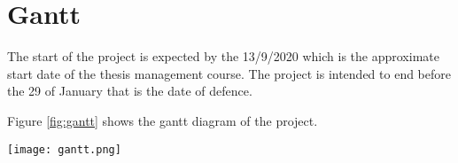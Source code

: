 \section{Gantt}

\justify
The start of the project is expected by the 13/9/2020 which is the approximate start date of the thesis management course. The project is intended to end before the 29 of January that is the date of defence.

\justify
Figure \ref{fig:gantt} shows the gantt diagram of the project.

\begin{sidewaysfigure}[htbp]
  \centering
  \texttt{[image: gantt.png]}
  \caption[Gantt diagram]{Gantt diagram. Own compilation.}
  \label{fig:gantt}
\end{sidewaysfigure}


